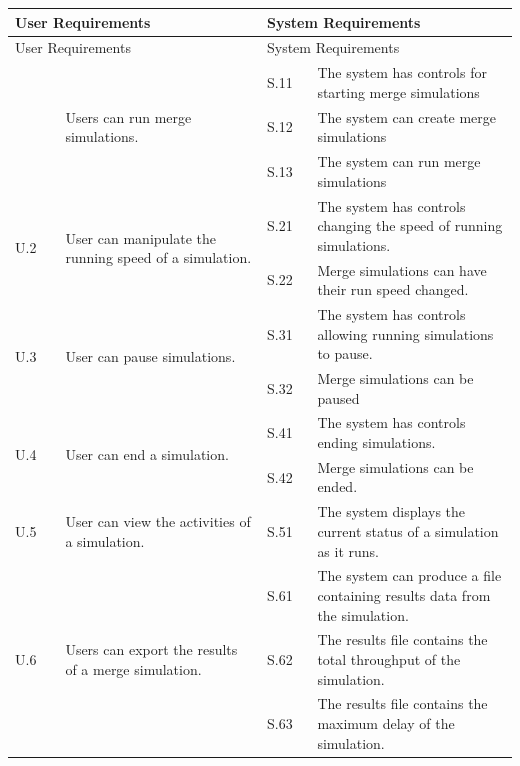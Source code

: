 \begin{longtable}{|p{0.1\linewidth}|p{0.4\linewidth}|p{0.1\linewidth}|p{0.4\linewidth}|}
\hline
\multicolumn{2}{|l|}{User Requirements} & \multicolumn{2}{l|}{System Requirements} \\
\hline
\endfirsthead

\hline
\multicolumn{2}{|l|}{User Requirements} & \multicolumn{2}{l|}{System Requirements} \\
\hline
\endhead

\hline
\endfoot

\hline
\endlastfoot

\multirow{3}{*}{U.1} & \multirow{3}{*}{\parbox{\linewidth}{Users can run merge simulations.}} 
 & S.11 & The system has controls for starting merge simulations \\
 &  & S.12 & The system can create merge simulations \\
 &  & S.13 & The system can run merge simulations \\
\hline
\multirow{2}{*}{U.2} & \multirow{2}{*}{\parbox{\linewidth}{User can manipulate the running speed of a simulation.}}
 & S.21 & The system has controls changing the speed of running simulations. \\
 &  & S.22 & Merge simulations can have their run speed changed. \\ 
\hline
\multirow{2}{*}{U.3} & \multirow{2}{*}{\parbox{\linewidth}{User can pause simulations.}}
 & S.31 & The system has controls allowing running simulations to pause. \\
 &  & S.32 & Merge simulations can be paused \\ 
\hline
\multirow{2}{*}{U.4} & \multirow{2}{*}{\parbox{\linewidth}{User can end a simulation.}}
 & S.41 & The system has controls ending simulations. \\
 &  & S.42 & Merge simulations can be ended. \\ 
\hline
U.5 & User can view the activities of a simulation. & S.51 & The system displays the current status of a simulation as it runs. \\
\hline
\multirow{9}{*}{U.6} & \multirow{9}{*}{\parbox{\linewidth}{Users can export the results of a merge simulation.}}
 & S.61 & The system can produce a file containing results data from the simulation. \\
 &  & S.62 & The results file contains the total throughput of the simulation. \\
 &  & S.63 & The results file contains the maximum delay of the simulation. \\

\end{longtable}
